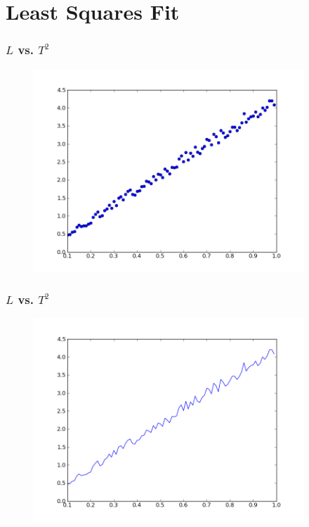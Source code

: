 \documentclass[14pt,compress]{beamer}
\begin{document}
\section{Least Squares Fit}
\begin{frame}[fragile]
\frametitle{$L$ vs. $T^2$}
\vspace{-0.15in}
\begin{figure}
\includegraphics[width=4in]{data/L-Tsq-points.png}
\end{figure}
\end{frame}

\begin{frame}[fragile]
\frametitle{$L$ vs. $T^2$}
\vspace{-0.15in}
\begin{figure}
\includegraphics[width=4in]{data/L-Tsq-Line.png}
\end{figure}
\end{frame}
\end{document}
